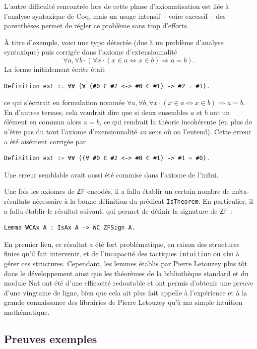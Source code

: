 \documentclass[a4paper]{article}
\newcommand{\ZF}{\mathsf{ZF}}
\theoremstyle{remark}
\theoremstyle{remark}
\theoremstyle{remark}
\theoremstyle{definition}
\theoremstyle{definition}
\theoremstyle{definition}
\begin{document}
L'autre difficulté rencontrée lors de cette phase d'axiomatisation est liée à l'analyse syntaxique de Coq, mais un usage intensif -- voire excessif -- des parenthèses permet de régler ce problème sans trop d'efforts.

\`A titre d'exemple, voici une typo détectée (due à un problème d'analyse syntaxique) puis corrigée dans l'axiome d'extensionnalité \[ \forall a, \forall b \cdot (\forall x \cdot (x \in a \Leftrightarrow x \in b) \Rightarrow a = b). \] La forme initialement écrite était
\begin{verbatim}
Definition ext := ∀∀ (∀ (#0 ∈ #2 <-> #0 ∈ #1) -> #2 = #1).
\end{verbatim}
ce qui s'écrirait en formulation nommée $\forall a, \forall b, \forall x \cdot (x \in a \Leftrightarrow x \in b) \Rightarrow a = b$. En d'autres termes, cela voudrait dire que si deux ensembles $a$ et $b$ ont un élément en commun alors $a = b$, ce qui rendrait la théorie incohérente (en plus de n'être pas du tout l'axiome d'exensionnalité au sens où on l'entend). Cette erreur a été aisément corrigée par
\begin{verbatim}
Definition ext := ∀∀ ((∀ #0 ∈ #2 <-> #0 ∈ #1) -> #1 = #0).
\end{verbatim}

Une erreur semblable avait aussi été commise dans l'axiome de l'infini.
\smallskip

Une fois les axiomes de $\ZF$ encodés, il a fallu établir un certain nombre de méta-résultats nécessaire à la bonne définition du prédicat \verb+IsTheorem+. En particulier, il a fallu établir le résultat suivant, qui permet de définir la signature de $\ZF$ :
\begin{verbatim}
Lemma WCAx A : IsAx A -> WC ZFSign A.
\end{verbatim}
En premier lieu, ce résultat a été fort problématique, en raison des structures finies qu'il fait intervenir, et de l'incapacité des tactiques \verb+intuition+ ou \verb+cbn+ à gérer ces structures. Cependant, les lemmes établis par Pierre Letouzey plus tôt dans le développement ainsi que les théorèmes de la bibliothèque standard et du module Nat ont été d'une efficacité redoutable et ont permis d'obtenir une preuve d'une vingtaine de ligne, bien que cela ait plus fait appelle à l'expérience et à la grande connaissance des librairies de Pierre Letouzey qu'à ma simple intuition mathématique.

\subsection{Preuves exemples} \label{ex}
\end{document}
